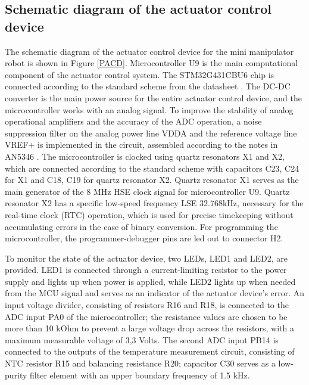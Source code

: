

\subsection{Schematic diagram of the actuator control device}

The schematic diagram of the actuator control device for the mini manipulator robot is shown in Figure \ref{PACD}. Microcontroller U9 is the main computational component of the actuator control system. The STM32G431CBU6 chip is connected according to the standard scheme from the datasheet \citep{STM32G431}. The DC-DC converter is the main power source for the entire actuator control device, and the microcontroller works with an analog signal. To improve the stability of analog operational amplifiers and the accuracy of the ADC operation, a noise suppression filter on the analog power line VDDA and the reference voltage line VREF+ is implemented in the circuit, assembled according to the notes in AN5346 \citep{STM2019}. The microcontroller is clocked using quartz resonators X1 and X2, which are connected according to the standard scheme with capacitors C23, C24 for X1 and C18, C19 for quartz resonator X2. Quartz resonator X1 serves as the main generator of the 8 MHz HSE clock signal for microcontroller U9. Quartz resonator X2 has a specific low-speed frequency LSE 32.768kHz, necessary for the real-time clock (RTC) operation, which is used for precise timekeeping without accumulating errors in the case of binary conversion. For programming the microcontroller, the programmer-debugger pins are led out to connector H2.

To monitor the state of the actuator device, two LEDs, LED1 and LED2, are provided. LED1 is connected through a current-limiting resistor to the power supply and lights up when power is applied, while LED2 lights up when needed from the MCU signal and serves as an indicator of the actuator device's error. An input voltage divider, consisting of resistors R16 and R18, is connected to the ADC input PA0 of the microcontroller; the resistance values are chosen to be more than 10 kOhm to prevent a large voltage drop across the resistors, with a maximum measurable voltage of 3,3 Volts. The second ADC input PB14 is connected to the outputs of the temperature measurement circuit, consisting of NTC resistor R15 and balancing resistance R20; capacitor C30 serves as a low-purity filter element with an upper boundary frequency of 1.5 kHz.

